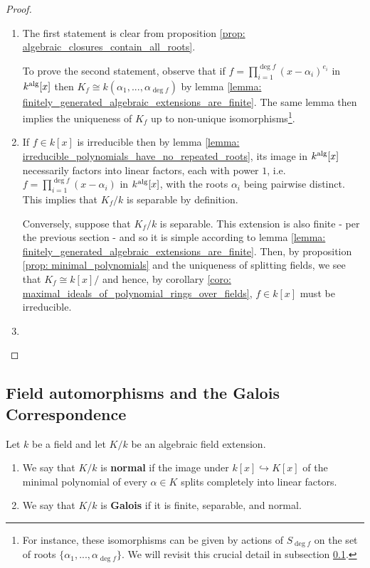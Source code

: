            \begin{proof}
                \begin{enumerate}
                    \item The first statement is clear from proposition \ref{prop: algebraic_closures_contain_all_roots}. 
                    
                    To prove the second statement, observe that if $f = \prod_{i = 1}^{\deg f} (x - \alpha_i)^{e_i}$ in $k^{\mathrm{alg}}[x]$ then $K_f \cong k(\alpha_1, ..., \alpha_{\deg f})$ by lemma \ref{lemma: finitely_generated_algebraic_extensions_are_finite}. The same lemma then implies the uniqueness of $K_f$ up to non-unique isomorphisms\footnote{For instance, these isomorphisms can be given by actions of $S_{\deg f}$ on the set of roots $\{\alpha_1, ..., \alpha_{\deg f}\}$. We will revisit this crucial detail in subsection \ref{subsection: field_automorphisms}.}.
                    \item If $f \in k[x]$ is irreducible then by lemma \ref{lemma: irreducible_polynomials_have_no_repeated_roots}, its image in $k^{\mathrm{alg}}[x]$ necessarily factors into linear factors, each with power $1$, i.e. $f = \prod_{i = 1}^{\deg f} (x - \alpha_i)$ in $k^{\mathrm{alg}}[x]$, with the roots $\alpha_i$ being pairwise distinct. This implies that $K_f/k$ is separable by definition. 

                    Conversely, suppose that $K_f/k$ is separable. This extension is also finite - per the previous section - and so it is simple according to lemma \ref{lemma: finitely_generated_algebraic_extensions_are_finite}. Then, by proposition \ref{prop: minimal_polynomials} and the uniqueness of splitting fields, we see that $K_f \cong k[x]/$ and hence, by corollary \ref{coro: maximal_ideals_of_polynomial_rings_over_fields}, $f \in k[x]$ must be irreducible.
                    \item 
                \end{enumerate}
            \end{proof}

    \subsection{Field automorphisms and the Galois Correspondence} \label{subsection: field_automorphisms}
        
        \begin{definition} \label{def: normal_and_galois_extensions}
            Let $k$ be a field and let $K/k$ be an algebraic field extension.
            \begin{enumerate}
                \item We say that $K/k$ is \textbf{normal} if the image under $k[x] \hookrightarrow K[x]$ of the minimal polynomial of every $\alpha \in K$ splits completely into linear factors.
                \item We say that $K/k$ is \textbf{Galois} if it is finite, separable, and normal.
            \end{enumerate}
        \end{definition}

